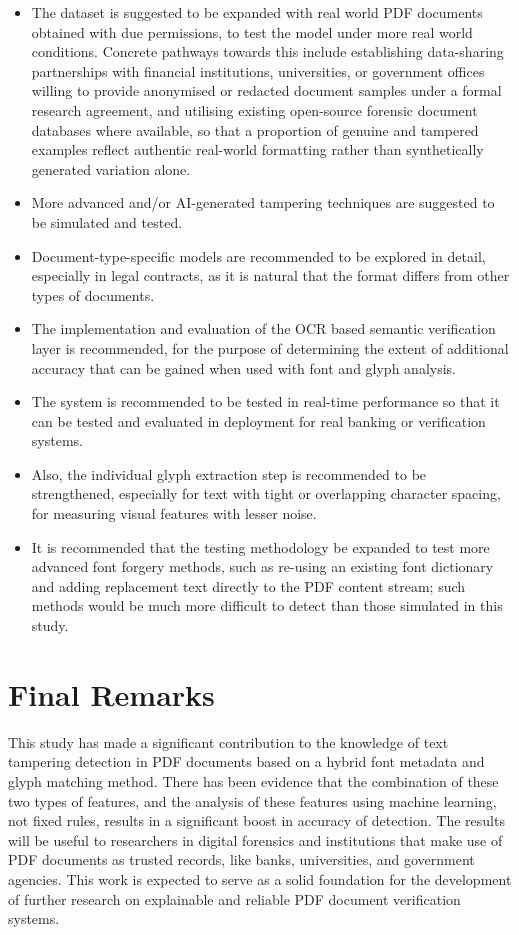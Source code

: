 \begin{itemize}
    \item The dataset is suggested to be expanded with real world PDF documents obtained with due permissions, to test the model under more real world conditions. Concrete pathways towards this include establishing data-sharing partnerships with financial institutions, universities, or government offices willing to provide anonymised or redacted document samples under a formal research agreement, and utilising existing open-source forensic document databases where available, so that a proportion of genuine and tampered examples reflect authentic real-world formatting rather than synthetically generated variation alone.
    \item More advanced and/or AI-generated tampering techniques are suggested to be simulated and tested.
    \item Document-type-specific models are recommended to be explored in detail, especially in legal contracts, as it is natural that the format differs from other types of documents.
    \item The implementation and evaluation of the OCR based semantic verification layer is recommended, for the purpose of determining the extent of additional accuracy that can be gained when used with font and glyph analysis.
    \item The system is recommended to be tested in real-time performance so that it can be tested and evaluated in deployment for real banking or verification systems.
    \item Also, the individual glyph extraction step is recommended to be strengthened, especially for text with tight or overlapping character spacing, for measuring visual features with lesser noise.
    \item It is recommended that the testing methodology be expanded to test more advanced font forgery methods, such as re-using an existing font dictionary and adding replacement text directly to the PDF content stream; such methods would be much more difficult to detect than those simulated in this study.
\end{itemize}

\section{Final Remarks}

This study has made a significant contribution to the knowledge of text tampering detection in PDF documents based on a hybrid font metadata and glyph matching method. There has been evidence that the combination of these two types of features, and the analysis of these features using machine learning, not fixed rules, results in a significant boost in accuracy of detection. The results will be useful to researchers in digital forensics and institutions that make use of PDF documents as trusted records, like banks, universities, and government agencies. This work is expected to serve as a solid foundation for the development of further research on explainable and reliable PDF document verification systems.
 